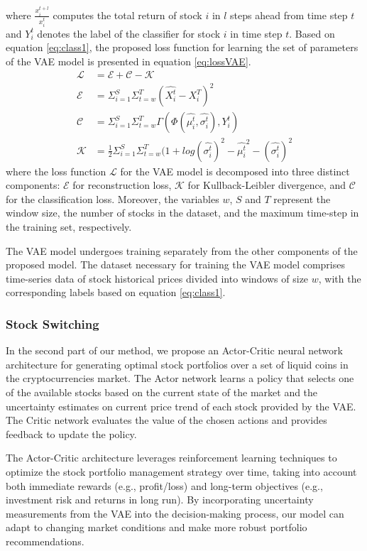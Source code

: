 where $\frac{x_i^{t+l}}{x_i^t}$ computes the total return of stock $i$ in $l$ steps ahead from time step $t$ and $Y_i^t$ denotes the label of the classifier for stock $i$ in time step $t$. Based on equation \eqref{eq:class1}, the proposed loss function for learning the set of parameters of the VAE model is presented in equation \eqref{eq:lossVAE}.
\begin{align}
	\mathcal{L} &= \mathcal{E}  + \mathcal{C} - \mathcal{K}	\label{eq:lossVAE}  \\
	\mathcal{E} &= \Sigma_{i=1}^S \Sigma_{t=w}^T (\hat{X_i^t} - X_i^T) ^ 2 	\label{eq:lossVAE2} \\
	\mathcal{C} &= \Sigma_{i=1}^S \Sigma_{t=w}^T \Gamma(\Phi(\hat{\mu_i^t}, \hat{\sigma_i^t}), Y_i^t) 	\label{eq:lossVAE3} \\
	\mathcal{K} &= \frac{1}{2} \Sigma_{i=1}^S \Sigma_{t=w}^T (1 + log(\hat{\sigma_i^t})^2 - \hat{\mu_i^t}^2 - (\hat{\sigma_i^t})^2 	\label{eq:lossVAE1} 
\end{align}
where the loss function $\mathcal{L}$ for the VAE model is decomposed into three distinct components: $\mathcal{E}$ for reconstruction loss, $\mathcal{K}$ for Kullback-Leibler divergence, and $\mathcal{C}$ for the classification loss. Moreover, the variables $w$, $S$ and $T$ represent the window size, the number of stocks in the dataset, and the maximum time-step in the training set, respectively.

The VAE model undergoes training separately from the other components of the proposed model. The dataset necessary for training the VAE model comprises time-series data of stock historical prices divided into windows of size $w$, with the corresponding labels based on equation \eqref{eq:class1}.

\subsubsection{Stock Switching}

In the second part of our method, we propose an Actor-Critic neural network architecture for generating optimal stock portfolios over a set of liquid coins in the cryptocurrencies market. The Actor network learns a policy that selects one of the available stocks based on the current state of the market and the uncertainty estimates on current price trend of each stock provided by the VAE. The Critic network evaluates the value of the chosen actions and provides feedback to update the policy.

The Actor-Critic architecture leverages reinforcement learning techniques to optimize the stock portfolio management strategy over time, taking into account both immediate rewards (e.g., profit/loss) and long-term objectives (e.g., investment risk and returns in long run). By incorporating uncertainty measurements from the VAE into the decision-making process, our model can adapt to changing market conditions and make more robust portfolio recommendations.

